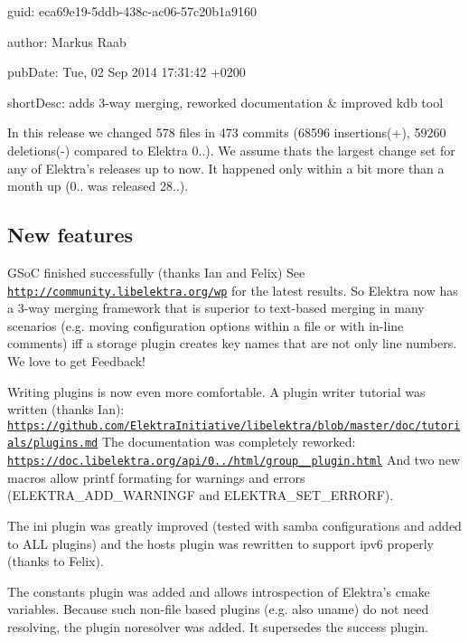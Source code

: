 
\begin{DoxyItemize}
\item guid\+: eca69e19-\/5ddb-\/438c-\/ac06-\/57c20b1a9160
\item author\+: Markus Raab
\item pub\+Date\+: Tue, 02 Sep 2014 17\+:31\+:42 +0200
\item short\+Desc\+: adds 3-\/way merging, reworked documentation \& improved kdb tool
\end{DoxyItemize}

In this release we changed 578 files in 473 commits (68596 insertions(+), 59260 deletions(-\/) compared to Elektra 0..). We assume thats the largest change set for any of Elektra’s releases up to now. It happened only within a bit more than a month up (0.. was released 28..).

\subsection*{New features}

G\+SoC finished successfully (thanks Ian and Felix) See \href{http://community.libelektra.org/wp}{\tt http\+://community.\+libelektra.\+org/wp} for the latest results. So Elektra now has a 3-\/way merging framework that is superior to text-\/based merging in many scenarios (e.\+g. moving configuration options within a file or with in-\/line comments) iff a storage plugin creates key names that are not only line numbers. We love to get Feedback!

Writing plugins is now even more comfortable. A plugin writer tutorial was written (thanks Ian)\+: \href{https://github.com/ElektraInitiative/libelektra/blob/master/doc/tutorials/plugins.md}{\tt https\+://github.\+com/\+Elektra\+Initiative/libelektra/blob/master/doc/tutorials/plugins.\+md} The documentation was completely reworked\+: \href{https://doc.libelektra.org/api/0.8.7/html/group__plugin.html}{\tt https\+://doc.\+libelektra.\+org/api/0../html/group\+\_\+\+\_\+plugin.\+html} And two new macros allow printf formating for warnings and errors (E\+L\+E\+K\+T\+R\+A\+\_\+\+A\+D\+D\+\_\+\+W\+A\+R\+N\+I\+N\+GF and E\+L\+E\+K\+T\+R\+A\+\_\+\+S\+E\+T\+\_\+\+E\+R\+R\+O\+RF).

The ini plugin was greatly improved (tested with samba configurations and added to A\+LL plugins) and the hosts plugin was rewritten to support ipv6 properly (thanks to Felix).

The constants plugin was added and allows introspection of Elektra’s cmake variables. Because such non-\/file based plugins (e.\+g. also uname) do not need resolving, the plugin noresolver was added. It supersedes the success plugin.

